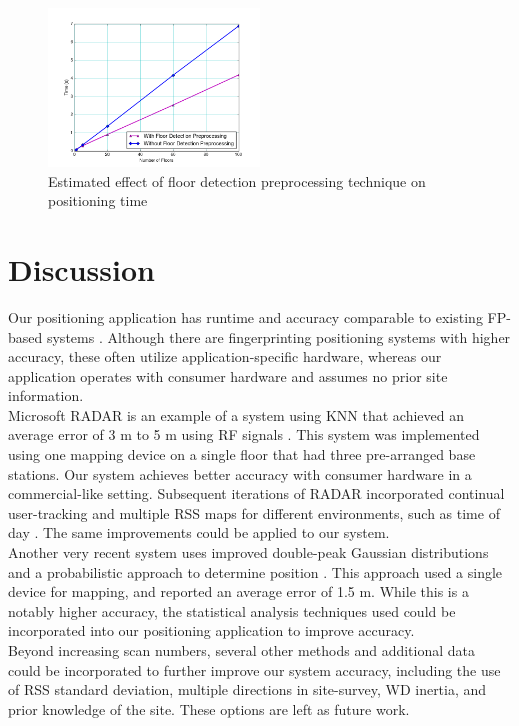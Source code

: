 \documentclass[conference]{IEEEtran}
\begin{document}
\begin{figure}[t!]
  \centering
    \includegraphics[width=0.5\textwidth]{time_comparison.png}
   \caption{Estimated effect of floor detection preprocessing technique on positioning time}
   \label{fig:floor_preprocessing_effect}
\end{figure}

\section{Discussion}
\indent Our positioning application has runtime and accuracy comparable to existing FP-based systems \cite{Liu}. Although there are fingerprinting positioning systems with higher accuracy, these often utilize application-specific hardware, whereas our application operates with consumer hardware and assumes no prior site information.\\
\indent Microsoft RADAR is an example of a system using KNN that achieved an average error of 3 m to 5 m using RF signals \cite{Bahl}. This system was implemented using one mapping device on a single floor that had three pre-arranged base stations. Our system achieves better accuracy with consumer hardware in a commercial-like setting. Subsequent iterations of RADAR incorporated continual user-tracking and multiple RSS maps for different environments, such as time of day \cite{Bahl2}. The same improvements could be applied to our system.\\
\indent Another very recent system uses improved double-peak Gaussian distributions and a probabilistic approach to determine position \cite{Chen}. This approach used a single device for mapping, and reported an average error of 1.5 m. While this is a notably higher accuracy, the statistical analysis techniques used could be incorporated into our positioning application to improve accuracy.\\ 
\indent Beyond increasing scan numbers, several other methods and additional data could be incorporated to further improve our system accuracy, including the use of RSS standard deviation, multiple directions in site-survey, WD inertia, and prior knowledge of the site. These options are left as future work.
\end{document}
